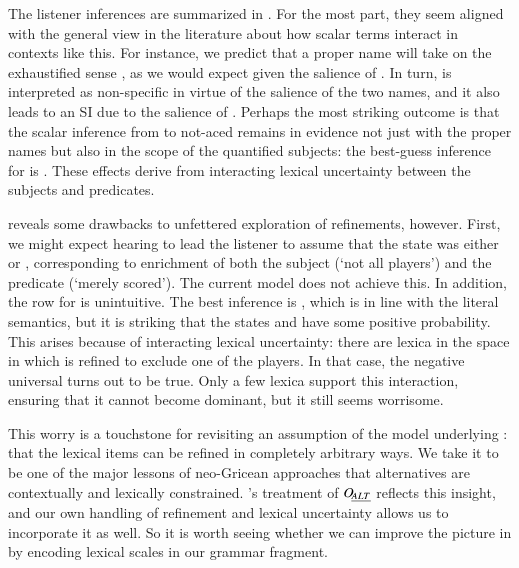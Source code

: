 \documentclass[leqno,12pt]{article}
\begin{document}
The listener inferences are summarized in . For
the most part, they seem aligned with the general view in the
literature about how scalar terms interact in contexts like this. For
instance, we predict that a proper name  will take on the
exhaustified sense , as we would expect given the
salience of . In turn,  is interpreted as
non-specific in virtue of the salience of the two names, and it also
leads to an SI due to the salience of . Perhaps the most
striking outcome is that the scalar inference from  to
not-aced remains in evidence not just with the proper names but also
in the scope of the quantified subjects: the best-guess inference for
 is .  These effects derive from
interacting lexical uncertainty between the subjects and predicates.

 reveals some drawbacks to unfettered exploration
of refinements, however. First, we might expect hearing  to lead the listener to assume that the state was
either  or , corresponding to enrichment of both
the subject (`not all players') and the predicate (`merely
scored'). The current model does not achieve this. In addition, the
row for  is unintuitive. The best inference is
, which is in line with the literal semantics, but it is
striking that the states  and  have some positive
probability. This arises because of interacting lexical uncertainty:
there are lexica in the space in which  is refined to
exclude one of the players. In that case, the negative universal turns
out to be true. Only a few lexica support this interaction, ensuring
that it cannot become dominant, but it still seems worrisome.

This worry is a touchstone for revisiting an assumption of the model
underlying : that the lexical items can be
refined in completely arbitrary ways. We take it to be one of the
major lessons of neo-Gricean approaches that alternatives are
contextually and lexically constrained. \CFS's treatment of $\mathop{O\negthinspace_{\emph{ALT}}}$
reflects this insight, and our own handling of refinement and lexical
uncertainty allows us to incorporate it as well. So it is worth seeing
whether we can improve the picture in  by
encoding lexical scales in our grammar fragment.
\end{document}
